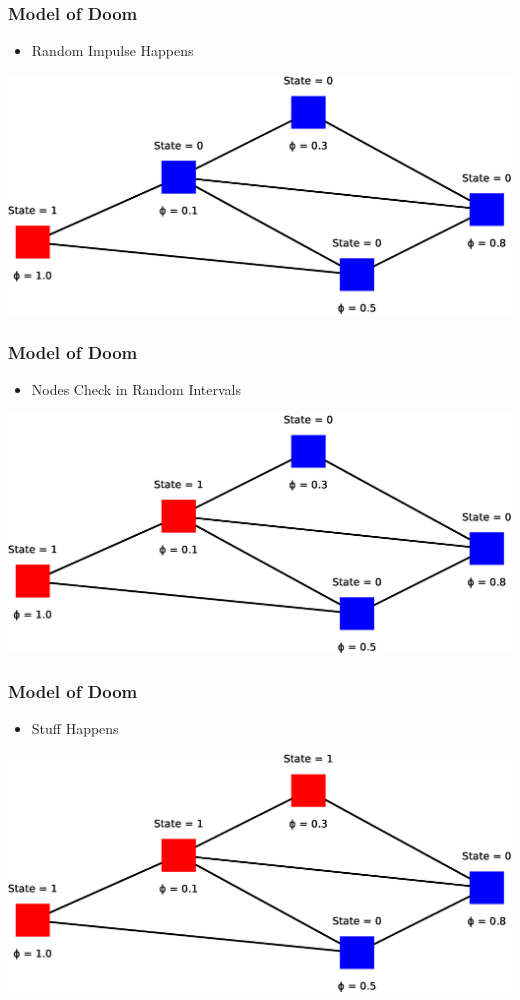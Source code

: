 \documentclass[slidestop,usenames,dvipsnames]{beamer}
\newcommand{\gitem}{\vfill\item}
\begin{document}
\begin{frame}
    \frametitle{Model of Doom}
    \begin{itemize}
        \gitem Random Impulse Happens
    \end{itemize}
    \vfill
    \includegraphics[width=\textwidth]{img/model5}
    \vfill
\end{frame}

\begin{frame}
    \frametitle{Model of Doom}
    \begin{itemize}
        \gitem Nodes Check in Random Intervals
    \end{itemize}
    \vfill
    \includegraphics[width=\textwidth]{img/model6}
    \vfill
\end{frame}

\begin{frame}
    \frametitle{Model of Doom}
    \begin{itemize}
        \gitem Stuff Happens
    \end{itemize}
    \vfill
    \includegraphics[width=\textwidth]{img/model7}
    \vfill
\end{frame}
\end{document}
